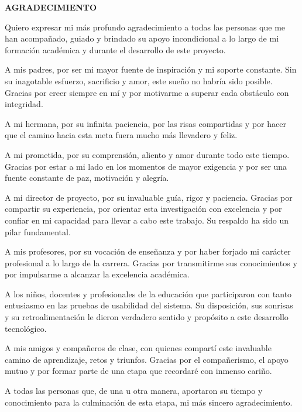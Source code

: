 \begin{center}
    \vspace*{0.5cm}
    {\bfseries AGRADECIMIENTO}
\end{center}
\vspace{0.8cm}

\justifying
Quiero expresar mi más profundo agradecimiento a todas las personas que me han acompañado, guiado y brindado su apoyo incondicional a lo largo de mi formación académica y durante el desarrollo de este proyecto.

A mis padres, por ser mi mayor fuente de inspiración y mi soporte constante. Sin su inagotable esfuerzo, sacrificio y amor, este sueño no habría sido posible. Gracias por creer siempre en mí y por motivarme a superar cada obstáculo con integridad.

A mi hermana, por su infinita paciencia, por las risas compartidas y por hacer que el camino hacia esta meta fuera mucho más llevadero y feliz.

A mi prometida, por su comprensión, aliento y amor durante todo este tiempo. Gracias por estar a mi lado en los momentos de mayor exigencia y por ser una fuente constante de paz, motivación y alegría.

A mi director de proyecto, por su invaluable guía, rigor y paciencia. Gracias por compartir su experiencia, por orientar esta investigación con excelencia y por confiar en mi capacidad para llevar a cabo este trabajo. Su respaldo ha sido un pilar fundamental.

A mis profesores, por su vocación de enseñanza y por haber forjado mi carácter profesional a lo largo de la carrera. Gracias por transmitirme sus conocimientos y por impulsarme a alcanzar la excelencia académica.

A los niños, docentes y profesionales de la educación que participaron con tanto entusiasmo en las pruebas de usabilidad del sistema. Su disposición, sus sonrisas y su retroalimentación le dieron verdadero sentido y propósito a este desarrollo tecnológico.

A mis amigos y compañeros de clase, con quienes compartí este invaluable camino de aprendizaje, retos y triunfos. Gracias por el compañerismo, el apoyo mutuo y por formar parte de una etapa que recordaré con inmenso cariño.

A todas las personas que, de una u otra manera, aportaron su tiempo y conocimiento para la culminación de esta etapa, mi más sincero agradecimiento.

\newpage
